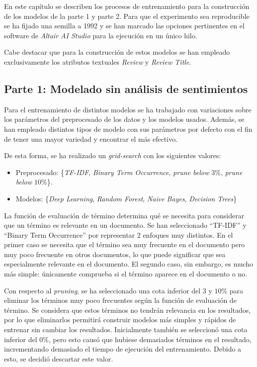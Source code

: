 \documentclass[es]{uc3mreport}
\begin{document}
\begin{report}
En este capítulo se describen los procesos de entrenamiento para la construcción de los modelos de la parte 1 y parte 2. Para que el experimento sea reproducible se ha fijado una semilla a 1992 y se han marcado las opciones pertinentes en el software de \textit{Altair AI Studio} para la ejecución en un único hilo.

Cabe destacar que para la construcción de estos modelos se han empleado exclusivamente los atributos textuales \textit{Review} y \textit{Review Title}.

\subsection{Parte 1: Modelado sin análisis de sentimientos}
\label{sec:parte1}

    Para el entrenamiento de distintos modelos se ha trabajado con variaciones
    sobre los parámetros del preprocesado de los datos y los modelos usados.
    Además, se han empleado distintos tipos de modelo con sus
    parámetros por defecto con el fin de tener una mayor variedad y encontrar
    el más efectivo.

    De esta forma, se ha realizado un \textit{grid-search} con los siguientes valores:
    \begin{itemize}
        \item Preprocesado: \{\textit{TF-IDF}, \textit{Binary Term Occurrence}, \textit{prune below $3\%$}, \textit{prune below $10\%$}\}.
        \item Modelos: \{\textit{Deep Learning}, \textit{Random Forest}, \textit{Naive Bayes}, \textit{Decision Trees}\}
    \end{itemize}

    La función de evaluación de término determina qué se necesita para considerar
    que un término es relevante en un documento. Se han seleccionado ``TF-IDF'' y
    ``Binary Term Occurrence'' por representar 2 enfoques muy distintos. En el
    primer caso se necesita que el término sea muy frecuente en el documento pero
    muy poco frecuente en otros documentos, lo que puede significar que sea especialmente
    relevante en el documento. El segundo caso, sin embargo, es mucho más simple:
    únicamente comprueba si el término aparece en el documento o no.

    Con respecto al \textit{pruning}, se ha seleccionado una cota inferior del $3$ y $10$\%
    para eliminar los términos muy poco frecuentes según la función de evaluación
    de término. Se considera que estos términos no tendrán relevancia en los
    resultados, por lo que eliminarlos permitirá construir modelos más simples y
    rápidos de entrenar sin cambiar los resultados. Inicialmente también se
    seleccionó una cota inferior del $0\%$, pero esto causó que hubiese demasiados
    términos en el resultado, incrementando demasiado el tiempo de ejecución del
    entrenamiento. Debido a esto, se decidió descartar este valor.


\end{report}
\end{document}

